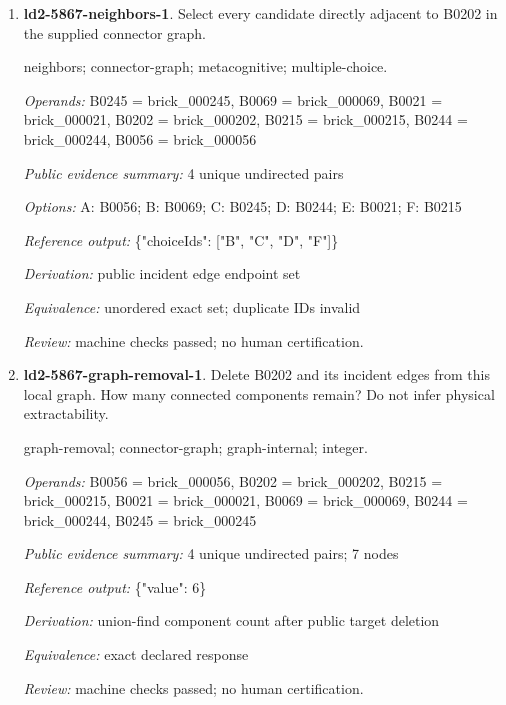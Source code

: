 \begin{enumerate}
\par{\small interface; connector-graph; metacognitive; single-choice.\par\textit{Operands:} B0033 = brick\_000033, B0011 = brick\_000011\par\textit{Public evidence summary:} \{"connectorRecord": \{"family": "stud", "aConnector": 38, "bConnector": 3\}, "scope": "Upstream connector tolerances and inset mesh intersections; unknown parts remain explicit, separate scene objects are not glued together; no load/force validation."\}\par\textit{Options:} A: ball; B: stud; C: hinge; D: axle; E: fixed\par\textit{Reference output:} \{"choiceId": "B"\}\par\textit{Derivation:} public connectorRecord.family equality\par\textit{Equivalence:} exact declared response\par\textit{Review:} machine checks passed; no human certification.}
\item \textbf{ld2-5867-neighbors-1}. Select every candidate directly adjacent to B0202 in the supplied connector graph.
\par{\small neighbors; connector-graph; metacognitive; multiple-choice.\par\textit{Operands:} B0245 = brick\_000245, B0069 = brick\_000069, B0021 = brick\_000021, B0202 = brick\_000202, B0215 = brick\_000215, B0244 = brick\_000244, B0056 = brick\_000056\par\textit{Public evidence summary:} 4 unique undirected pairs\par\textit{Options:} A: B0056; B: B0069; C: B0245; D: B0244; E: B0021; F: B0215\par\textit{Reference output:} \{"choiceIds": ["B", "C", "D", "F"]\}\par\textit{Derivation:} public incident edge endpoint set\par\textit{Equivalence:} unordered exact set; duplicate IDs invalid\par\textit{Review:} machine checks passed; no human certification.}
\item \textbf{ld2-5867-graph-removal-1}. Delete B0202 and its incident edges from this local graph. How many connected components remain? Do not infer physical extractability.
\par{\small graph-removal; connector-graph; graph-internal; integer.\par\textit{Operands:} B0056 = brick\_000056, B0202 = brick\_000202, B0215 = brick\_000215, B0021 = brick\_000021, B0069 = brick\_000069, B0244 = brick\_000244, B0245 = brick\_000245\par\textit{Public evidence summary:} 4 unique undirected pairs; 7 nodes\par\textit{Reference output:} \{"value": 6\}\par\textit{Derivation:} union-find component count after public target deletion\par\textit{Equivalence:} exact declared response\par\textit{Review:} machine checks passed; no human certification.}

\end{enumerate}
